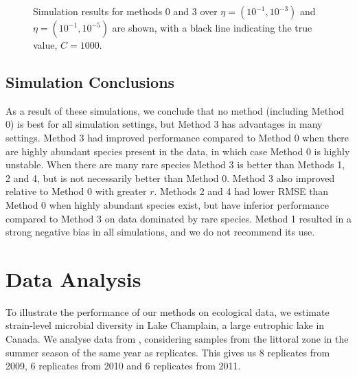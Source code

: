 \documentclass[oupdraft]{bio}
\begin{document}
\begin{figure}[t]
\caption{Simulation results for methods 0 and 3 over $\eta = (10^{-1}, 10^{-3})$ and $\eta = (10^{-1}, 10^{-5})$ are shown, with a black line indicating the true value, $C = 1000$.
\label{fig:tuning_sim_2}}
\centering{}
\end{figure}

\subsection{Simulation Conclusions}

As a result of these simulations, we conclude that no method (including Method 0) is best for all simulation settings, but Method 3 has advantages in many settings. Method 3 had improved performance compared to Method 0 when there are highly abundant species present in the data, in which case Method 0 is highly unstable.  When there are many rare species Method 3 is better than Methods 1, 2 and 4, but is not necessarily better than Method 0.  Method 3 also improved relative to Method 0 with greater $r$.  Methods 2 and 4 had lower RMSE than Method 0 when highly abundant species exist, but have inferior performance compared to Method 3 on data dominated by rare species. Method 1 resulted in a strong negative bias in all simulations, and we do not recommend its use.

\section{Data Analysis}
\label{sec:data_analysis}

To illustrate the performance of our methods on ecological data, we estimate strain-level microbial diversity in Lake Champlain, a large eutrophic lake in Canada.  We analyse data from \citet{tromas_2017}, considering samples from the littoral zone in the summer season of the same year as replicates. This gives us 8 replicates from 2009, 6 replicates from 2010 and 6 replicates from 2011.  %
\end{document}
